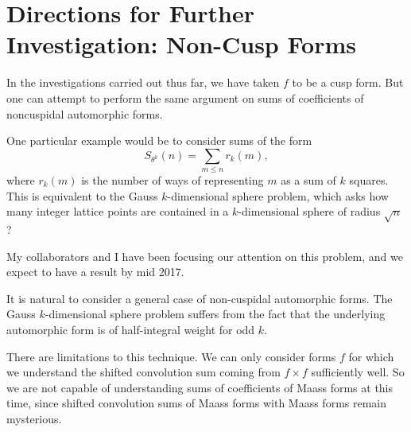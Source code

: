 \section{Directions for Further Investigation: Non-Cusp Forms}



In the investigations carried out thus far, we have taken $f$ to be a cusp form.
But one can attempt to perform the same argument on sums of coefficients of noncuspidal
automorphic forms.


One particular example would be to consider sums of the form
\begin{equation}
  S_{\theta^k}(n) = \sum_{m \leq n} r_k(m),
\end{equation}
where $r_k(m)$ is the number of ways of representing $m$ as a sum of $k$ squares.
This is equivalent to the Gauss $k$-dimensional sphere problem, which asks how many
integer lattice points are contained in a $k$-dimensional sphere of radius $\sqrt{n}$?


My collaborators and I have been focusing our attention on this problem, and we expect to
have a result by mid 2017.


It is natural to consider a general case of non-cuspidal automorphic forms.
The Gauss $k$-dimensional sphere problem suffers from the fact that the underlying
automorphic form is of half-integral weight for odd $k$.


\begin{remark}
  There are limitations to this technique.
  We can only consider forms $f$ for which we understand the shifted convolution sum
  coming from $f \times f$ sufficiently well.
  So we are not capable of understanding sums of coefficients of Maass forms at this time,
  since shifted convolution sums of Maass forms with Maass forms remain mysterious.
\end{remark}


